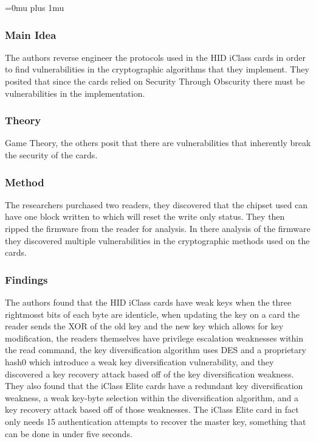 \Urlmuskip=0mu plus 1mu\relax

\subsubsection{Main Idea}

\noindent
The authors reverse engineer the protocols used in the HID iClass cards in order to find vulnerabilities in the cryptographic algorithms that they implement.  They posited that since the cards relied on Security Through Obscurity there must be vulnerabilities in the implementation.

\subsubsection{Theory}

\noindent
Game Theory, the others posit that there are vulnerabilities that inherently break the security of the cards.

\subsubsection{Method}

\noindent
The researchers purchased two readers, they discovered that the chipset used can have one block written to which will reset the write only status. They then ripped the firmware from the reader for analysis.  In there analysis of the firmware they discovered multiple vulnerabilities in the cryptographic methods used on the cards.

\subsubsection{Findings}

\noindent
The authors found that the HID iClass cards have weak keys when the three rightmosst bits of each byte are identicle, when updating the key on a card the reader sends the XOR of the old key and the new key which allows for key modification, the readers themselves have privilege escalation weaknesses within the read command, the key diversification algorithm uses DES and a proprietary hash0 which introduce a weak key diversification vulnerability, and they discovered a key recovery attack based off of the key diversification weakness.  They also found that the iClass Elite cards have a redundant key diversification weakness, a weak key-byte selection within the diversification algorithm, and a key recovery attack based off of those weaknesses.  The iClass Elite card in fact only needs 15 authentication attempts to recover the master key, something that can be done in under five seconds.

